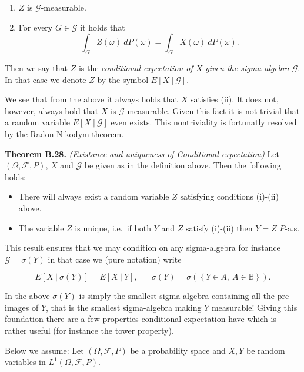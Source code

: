 \documentclass[
]{article}
\providecommand{\tightlist}{%
  \setlength{\itemsep}{0pt}\setlength{\parskip}{0pt}}
\begin{document}
\begin{enumerate}
\def\labelenumi{\roman{enumi}.}
\tightlist
\item
  \(Z\) is \(\mathcal{G}\)-measurable.
\item
  For every \(G\in\mathcal{G}\) it holds that
  \[\int_G Z(\omega)\ dP(\omega)=\int_G X(\omega)\ dP(\omega).\]
\end{enumerate}

Then we say that \(Z\) is the \emph{conditional expectation of \(X\)
given the sigma-algebra \(\mathcal{G}\)}. In that case we denote \(Z\)
by the symbol \(E[X\ \vert\ \mathcal{G}]\).

We see that from the above it always holds that \(X\) satisfies (ii). It
does not, however, always hold that \(X\) is \(\mathcal{G}\)-measurable.
Given this fact it is not trivial that a random variable
\(E[X\ \vert\ \mathcal{G}]\) even exists. This nontriviality is
fortunatly resolved by the Radon-Nikodym theorem.

\textbf{Theorem B.28.} \emph{(Existance and uniqueness of Conditional
expectation)} Let \((\Omega,\mathcal{F},P)\), \(X\) and \(\mathcal{G}\)
be given as in the definition above. Then the following holds:

\begin{itemize}
\tightlist
\item
  There will always exist a random variable \(Z\) satisfying conditions
  (i)-(ii) above.
\item
  The variable \(Z\) is unique, i.e.~if both \(Y\) and \(Z\) satisfy
  (i)-(ii) then \(Y=Z\) \(P\)-a.s.
\end{itemize}

This result ensures that we may condition on any sigma-algebra for
instance \(\mathcal{G}=\sigma(Y)\) in that case we (pure notation) write

\[
E[X\ \vert\ \sigma(Y)]=E[X\ \vert\ Y],\hspace{20pt}\sigma(Y)=\sigma\left(\left\{ Y\in A,\ A\in\mathbb{B}\right\}\right).
\]

In the above \(\sigma(Y)\) is simply the smallest sigma-algebra
containing all the pre-images of \(Y\), that is the smallest
sigma-algebra making \(Y\) measurable! Giving this foundation there are
a few properties conditional expectation have which is rather useful
(for instance the tower property).

Below we assume: Let \((\Omega,\mathcal{F},P)\) be a probability space
and \(X,Y\) be random variables in \(L^1(\Omega,\mathcal{F},P)\).
\end{document}
